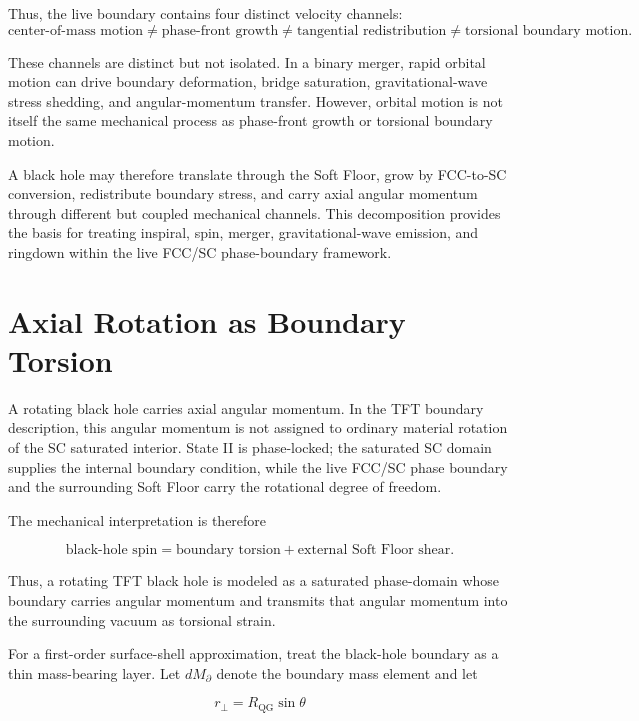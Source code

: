 Thus, the live boundary contains four distinct velocity channels:
\begin{equation}
    \text{center-of-mass motion} \neq \text{phase-front growth} \neq \text{tangential redistribution} \neq \text{torsional boundary motion}.
\end{equation}

These channels are distinct but not isolated. In a binary merger, rapid orbital motion can drive boundary deformation, bridge saturation, gravitational-wave stress shedding, and angular-momentum transfer. However, orbital motion is not itself the same mechanical process as phase-front growth or torsional boundary motion.

A black hole may therefore translate through the Soft Floor, grow by FCC-to-SC conversion, redistribute boundary stress, and carry axial angular momentum through different but coupled mechanical channels. This decomposition provides the basis for treating inspiral, spin, merger, gravitational-wave emission, and ringdown within the live FCC/SC phase-boundary framework.

\section{Axial Rotation as Boundary Torsion}

A rotating black hole carries axial angular momentum. In the TFT boundary description, this angular momentum is not assigned to ordinary material rotation of the SC saturated interior. State II is phase-locked; the saturated SC domain supplies the internal boundary condition, while the live FCC/SC phase boundary and the surrounding Soft Floor carry the rotational degree of freedom.

The mechanical interpretation is therefore

\begin{equation}
    \text{black-hole spin}
    =
    \text{boundary torsion}
    +
    \text{external Soft Floor shear}.
\end{equation}

Thus, a rotating TFT black hole is modeled as a saturated phase-domain whose boundary carries angular momentum and transmits that angular momentum into the surrounding vacuum as torsional strain.

For a first-order surface-shell approximation, treat the black-hole boundary as a thin mass-bearing layer. Let \(dM_{\partial}\) denote the boundary mass element and let

\begin{equation}
    r_\perp
    =
    R_{\mathrm{QG}}\sin\theta
\end{equation}

